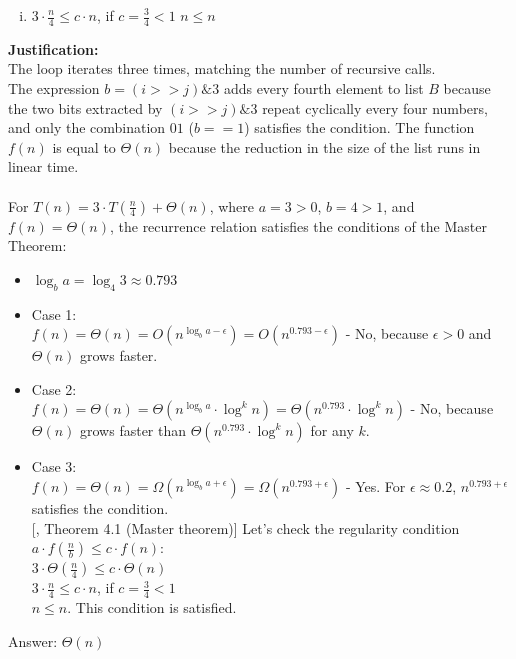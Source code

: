 \documentclass[dvipsnames]{article}
\begin{document}
\begin{enumerate}
\begin{enumerate}[(i)]
    \item $ 3 \cdot \frac{n}{4} \leq c \cdot n $, if $ c = \frac{3}{4} < 1 $ \xrightarrow[]{} $ n \leq n $
  \end{enumerate}
   \textbf{Justification:} \\
The loop iterates three times, matching the number of recursive calls.\\ The expression $b = (i >> j) \& 3$ adds every fourth element to list $B$ because the two bits extracted by $(i >> j) \& 3$ repeat cyclically every four numbers, and only the combination $01$ ($b == 1$) satisfies the condition. The function $f(n)$ is equal to $\Theta(n)$ because the reduction in the size of the list runs in linear time.\\
\\
For $T(n) = 3 \cdot T(\frac{n}{4}) + \Theta(n )$, where $ a = 3 > 0 $, $ b = 4 > 1 $, and $ f(n) = \Theta(n ) $, the recurrence relation satisfies the conditions of the Master Theorem:
    \begin{itemize}
        \item $ \log_{b} a =\log_{4} 3 \approx 0.793 $\\
        \item Case 1: \\
        \hspace{30mm} $ f(n) = \Theta(n ) = O(n^{\log_{b} a - \epsilon})= O(n^{0.793 - \epsilon}) $ - No, because $ \epsilon > 0 $ and $\Theta(n )$ grows faster.
        \item Case 2: \\
        \hspace{30mm} $ f(n) = \Theta(n )  = \Theta(n^{\log_{b} a}\cdot \log^k n)= \Theta(n^{0.793} \cdot \log^k n) $ - No, because $\Theta(n)$ grows faster than $\Theta(n^{0.793} \cdot \log^k n)$ for any $k$.
        \item Case 3: \\
        \hspace{30mm} $ f(n) = \Theta(n ) = \Omega(n^{\log_{b} a + \epsilon}) = \Omega(n^{0.793 + \epsilon}) $ - Yes. For $ \epsilon \approx 0.2 $, $ n^{0.793 + \epsilon} $ satisfies the condition. \\
        \hspace{30mm}[\cite{Cormen2022}, Theorem 4.1 (Master theorem)] Let's check the regularity condition $ a \cdot f\left(\frac{n}{b}\right) \leq c \cdot f(n) $: \\
        \hspace{35mm} $ 3 \cdot \Theta(\frac{n}{4} ) \leq c \cdot \Theta(n ) $ \\
        \hspace{35mm}$ 3 \cdot \frac{n}{4} \leq c \cdot n $, if $ c = \frac{3}{4} < 1 $ \\
        \hspace{35mm} $ n \leq n $. This condition is satisfied.
    \end{itemize}
    Answer: $ \Theta(n) $
    \color{black}


\end{enumerate}
\end{document}
